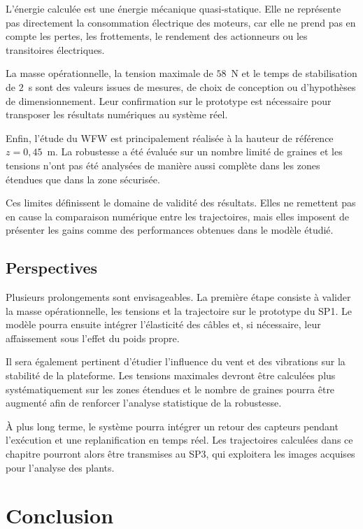 L'énergie calculée est une énergie mécanique quasi-statique. Elle ne représente pas directement la consommation électrique des moteurs, car elle ne prend pas en compte les pertes, les frottements, le rendement des actionneurs ou les transitoires électriques.

La masse opérationnelle, la tension maximale de $58$~N et le temps de stabilisation de $2$~s sont des valeurs issues de mesures, de choix de conception ou d'hypothèses de dimensionnement. Leur confirmation sur le prototype est nécessaire pour transposer les résultats numériques au système réel.

Enfin, l'étude du WFW est principalement réalisée à la hauteur de référence $z=0{,}45$~m. La robustesse a été évaluée sur un nombre limité de graines et les tensions n'ont pas été analysées de manière aussi complète dans les zones étendues que dans la zone sécurisée.

Ces limites définissent le domaine de validité des résultats. Elles ne remettent pas en cause la comparaison numérique entre les trajectoires, mais elles imposent de présenter les gains comme des performances obtenues dans le modèle étudié.

\subsection{Perspectives}

Plusieurs prolongements sont envisageables. La première étape consiste à valider la masse opérationnelle, les tensions et la trajectoire sur le prototype du SP1. Le modèle pourra ensuite intégrer l'élasticité des câbles et, si nécessaire, leur affaissement sous l'effet du poids propre.

Il sera également pertinent d'étudier l'influence du vent et des vibrations sur la stabilité de la plateforme. Les tensions maximales devront être calculées plus systématiquement sur les zones étendues et le nombre de graines pourra être augmenté afin de renforcer l'analyse statistique de la robustesse.

À plus long terme, le système pourra intégrer un retour des capteurs pendant l'exécution et une replanification en temps réel. Les trajectoires calculées dans ce chapitre pourront alors être transmises au SP3, qui exploitera les images acquises pour l'analyse des plants.

\section*{Conclusion}

